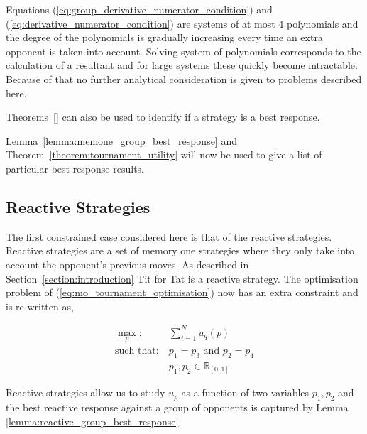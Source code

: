 \documentclass[10pt]{article}
\newcommand{\R}{\mathbb{R}}
\begin{document}
Equations (\ref{eq:group_derivative_numerator_condition}) and
(\ref{eq:derivative_numerator_condition})
are systems of at most \(4\) polynomials and the degree of the polynomials is gradually increasing
every time an extra opponent is taken into account. Solving system of polynomials corresponds
to the calculation of a resultant and for large systems these quickly become intractable.
Because of that no further analytical consideration is given to problems described
here.

Theorems~\ref{} can also be used to identify if a strategy is a best response.

Lemma~\ref{lemma:memone_group_best_response} and Theorem~\ref{theorem:tournament_utility}
will now be used to give a list of particular best response results.

\subsection{Reactive Strategies}\label{section:reactive_analytical}

The first constrained case considered here is that of the reactive strategies.
Reactive strategies are a set of memory one strategies where they only take into
account the opponent's previous moves. As described in Section~\ref{section:introduction}
Tit for Tat is a reactive strategy. The optimisation problem of (\ref{eq:mo_tournament_optimisation})
now has an extra constraint and is re written as,

\begin{equation}\label{eq:reactive_tournament_optimisation}
\begin{aligned}
\max_p: & \ \sum_{i=1} ^ N u_q(p)
\\
\text{such that}: & \ p_1 = p_3 \text{ and } p_2 = p_4\\
    & \ p_1, p_2 \in \R_{[0, 1]}.
\end{aligned}
\end{equation}

Reactive strategies allow us to study \(u_p\) as a function of two variables
\(p_1, p_2\) and the best reactive response against a group of opponents is captured by Lemma
\ref{lemma:reactive_group_best_response}.
\end{document}
